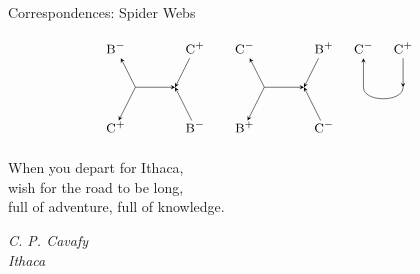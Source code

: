 \documentclass{beamer}
\begin{document}
\begin{frame}{Correspondences: Spider Webs}
\begin{figure}[h!]
\[\begin{tikzpicture}
			\node (i32) at (3.75,-6) {$\textsc{\small B}^-$};
			\node (ii32) at (5.75,-6) {$\textsc{\small C}^+$};
			\node (d32) at (4.25,-7) {};
			\node (dd32) at (5.25,-7) {};
			\node (o32) at (3.75,-8) {$\textsc{\small C}^+$};
			\node (oo32) at (5.75,-8) {$\textsc{\small B}^-$};
			\draw[<-,>=stealth] (i32) -- (d32.center);
			\draw[->,>=stealth] (ii32) -- (dd32.center);
			\draw[->,>=stealth] (d32.center) -- (dd32.center);
			\draw[->,>=stealth, shorten >=5pt] (d32.center) -- (o32.center);
			\draw[<-,>=stealth, shorten >=5pt] (dd32.center) -- (oo32.center);
			
			\node (i33) at (7,-6) {$\textsc{\small C}^-$};
			\node (ii33) at (9,-6) {$\textsc{\small B}^+$};
			\node (d33) at (7.5,-7) {};
			\node (dd33) at (8.5,-7) {};
			\node (o33) at (7,-8) {$\textsc{\small B}^+$};
			\node (oo33) at (9,-8) {$\textsc{\small C}^-$};
			\draw[<-,>=stealth] (i33) -- (d33.center);
			\draw[->,>=stealth] (ii33) -- (dd33.center);
			\draw[->,>=stealth] (d33.center) -- (dd33.center);
			\draw[->,>=stealth, shorten >=5pt] (d33.center) -- (o33.center);
			\draw[<-,>=stealth, shorten >=5pt] (dd33.center) -- (oo33.center);
			
			\node (i34) at (10,-6) {$\textsc{\small C}^-$};
			\node (ii34) at (11,-6) {$\textsc{\small C}^+$};
			\node (d34) at (10,-7) {};
			\node (dd34) at (11,-7) {};
			\draw[<-,>=stealth] (i34) -- (d34.center);
			\draw[->,>=stealth] (ii34) -- (dd34.center);
			\draw (d34.center) edge [-,>=stealth,bend right=90] (dd34.center);
			
			\end{tikzpicture}
			\]
			\end{figure}
	\end{frame}
	\begin{frame}{}
		\epigraph
			{When you depart for Ithaca,\\wish for the road to be long,\\full of adventure, full of knowledge.}
			{\textit{C. P. Cavafy\\ Ithaca}}
	\end{frame}
  	
\end{document}

